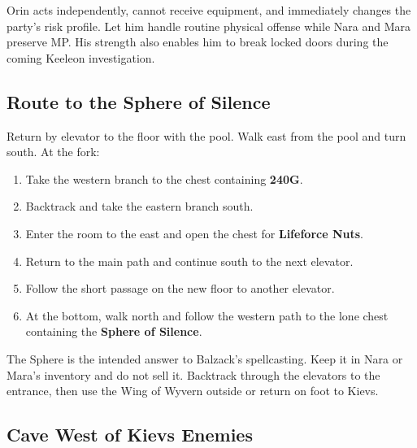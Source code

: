 \documentclass[
  american,
  10pt,
  letterpaper,
  oneside,
  open=any]{scrreprt}
\providecommand{\tightlist}{%
  \setlength{\itemsep}{0pt}\setlength{\parskip}{0pt}}
\begin{document}
Orin acts independently, cannot receive equipment, and immediately
changes the party's risk profile. Let him handle routine physical
offense while Nara and Mara preserve MP. His strength also enables him
to break locked doors during the coming Keeleon investigation.

\subsection{Route to the Sphere of
Silence}\label{route-to-the-sphere-of-silence}

Return by elevator to the floor with the pool. Walk east from the pool
and turn south. At the fork:

\begin{enumerate}
\def\labelenumi{\arabic{enumi}.}
\tightlist
\item
  Take the western branch to the chest containing \textbf{240G}.
\item
  Backtrack and take the eastern branch south.
\item
  Enter the room to the east and open the chest for \textbf{Lifeforce
  Nuts}.
\item
  Return to the main path and continue south to the next elevator.
\item
  Follow the short passage on the new floor to another elevator.
\item
  At the bottom, walk north and follow the western path to the lone
  chest containing the \textbf{Sphere of Silence}.
\end{enumerate}

The Sphere is the intended answer to Balzack's spellcasting. Keep it in
Nara or Mara's inventory and do not sell it. Backtrack through the
elevators to the entrance, then use the Wing of Wyvern outside or return
on foot to Kievs.

\subsection{Cave West of Kievs
Enemies}\label{cave-west-of-kievs-enemies}
\end{document}
